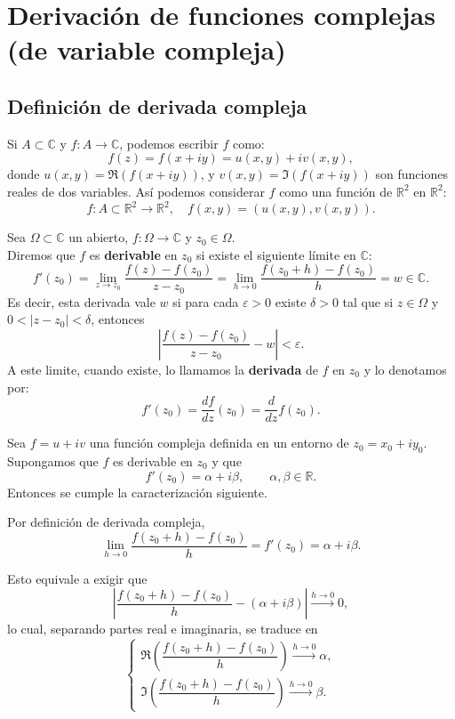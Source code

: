 \section{Derivación de funciones complejas (de variable compleja)}

\subsection{Definición de derivada compleja}

Si $A \subset \mathbb{C}$ y $f : A \to \mathbb{C}$, podemos escribir $f$ como:
\[
    f(z) = f(x+iy) = u(x,y) + iv(x,y),
\]
donde $u(x,y) = \Re(f(x+iy))$, y $v(x,y) = \Im(f(x+iy))$ son funciones reales de dos variables.
Así podemos considerar $f$ como una función de $\mathbb{R}^2$ en $\mathbb{R}^2$:
\[
    f: A \subset \mathbb{R}^2 \to \mathbb{R}^2, \quad f(x,y) = (u(x,y), v(x,y)).
\]

\begin{definición}
    Sea $\Omega \subset \mathbb{C}$ un abierto, $f : \Omega \to \mathbb{C}$ y $z_0 \in \Omega$.\\
    Diremos que $f$ es \textbf{derivable} en $z_0$ si existe el siguiente límite en $\mathbb{C}$:
    \[
        f'(z_0) = \lim_{z \to z_0} \frac{f(z) - f(z_0)}{z - z_0} = \lim_{h \to 0} \frac{f(z_0 + h) - f(z_0)}{h} = w \in \mathbb{C}.
    \]
    Es decir, esta derivada vale $w$ si para cada $\varepsilon > 0$ existe $\delta > 0$ tal que si $z \in \Omega$ y $0 < |z-z_0| < \delta$, entonces
    \[
        \left| \frac{f(z) - f(z_0)}{z - z_0} - w \right| < \varepsilon.
    \]
    A este limite, cuando existe, lo llamamos la \textbf{derivada} de $f$ en $z_0$ y lo denotamos por:
    \[
        f'(z_0) = \frac{df}{dz}(z_0) = \frac{d}{dz} f(z_0).
    \]
\end{definición}

Sea $f = u + iv$ una función compleja definida en un entorno de $z_0 = x_0 + i y_0$. 
Supongamos que $f$ es derivable en $z_0$ y que
\[
f'(z_0) = \alpha + i \beta, \qquad \alpha, \beta \in \mathbb{R}.
\]
Entonces se cumple la caracterización siguiente.

Por definición de derivada compleja,
\[
\lim_{h \to 0} \frac{f(z_0 + h) - f(z_0)}{h} = f'(z_0) = \alpha + i \beta.
\]

Esto equivale a exigir que
\[
\left| \frac{f(z_0 + h) - f(z_0)}{h} - (\alpha + i \beta) \right| \xrightarrow{h \to 0} 0,
\]
lo cual, separando partes real e imaginaria, se traduce en
\[
\begin{cases}
\Re\!\left( \dfrac{f(z_0 + h) - f(z_0)}{h} \right) \xrightarrow{h \to 0} \alpha, \\[1.2ex]
\Im\!\left( \dfrac{f(z_0 + h) - f(z_0)}{h} \right) \xrightarrow{h \to 0} \beta.
\end{cases}
\]

